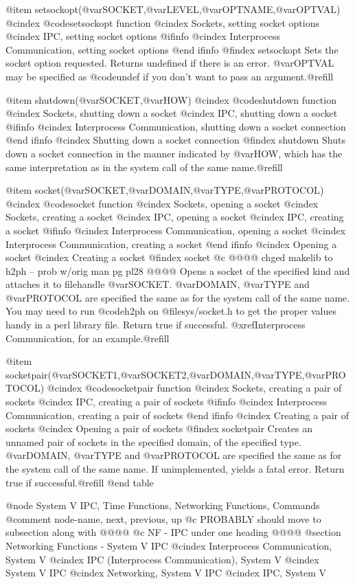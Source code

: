 {{{{{{{@item setsockopt(@var{SOCKET},@var{LEVEL},@var{OPTNAME},@var{OPTVAL})
@cindex @code{setsockopt} function
@cindex Sockets, setting socket options
@cindex IPC, setting socket options
@ifinfo
@cindex Interprocess Communication, setting socket options
@end ifinfo
@findex setsockopt
Sets the socket option requested.  Returns undefined if there is an
error.  @var{OPTVAL} may be specified as @code{undef} if you don't want
to pass an argument.@refill

@item shutdown(@var{SOCKET},@var{HOW})
@cindex @code{shutdown} function
@cindex Sockets, shutting down a socket
@cindex IPC, shutting down a socket
@ifinfo
@cindex Interprocess Communication, shutting down a socket connection
@end ifinfo
@cindex Shutting down a socket connection
@findex shutdown
Shuts down a socket connection in the manner indicated by @var{HOW},
which has the same interpretation as in the system call of the same
name.@refill

@item socket(@var{SOCKET},@var{DOMAIN},@var{TYPE},@var{PROTOCOL})
@cindex @code{socket} function
@cindex Sockets, opening a socket
@cindex Sockets, creating a socket
@cindex IPC, opening a socket
@cindex IPC, creating a socket
@ifinfo
@cindex Interprocess Communication, opening a socket
@cindex Interprocess Communication, creating a socket
@end ifinfo
@cindex Opening a socket
@cindex Creating a socket
@findex socket
@c @@@@ chged makelib to h2ph -- prob w/orig man pg pl28 @@@@
Opens a socket of the specified kind and attaches it to filehandle
@var{SOCKET}.  @var{DOMAIN}, @var{TYPE} and @var{PROTOCOL} are specified
the same as for the system call of the same name.  You may need to run
@code{h2ph} on @file{sys/socket.h} to get the proper values handy in
a perl library file.  Return true if successful.  @xref{Interprocess
Communication}, for an example.@refill

@item socketpair(@var{SOCKET1},@var{SOCKET2},@var{DOMAIN},@var{TYPE},@var{PROTOCOL})
@cindex @code{socketpair} function
@cindex Sockets, creating a pair of sockets
@cindex IPC, creating a pair of sockets
@ifinfo
@cindex Interprocess Communication, creating a pair of sockets
@end ifinfo
@cindex Creating a pair of sockets
@cindex Opening a pair of sockets
@findex socketpair
Creates an unnamed pair of sockets in the specified domain, of the
specified type.  @var{DOMAIN}, @var{TYPE} and @var{PROTOCOL} are
specified the same as for the system call of the same name.  If
unimplemented, yields a fatal error.  Return true if successful.@refill
@end table

@node     System V IPC, Time Functions, Networking Functions, Commands
@comment  node-name,  next,  previous,  up
@c PROBABLY should move to subsection along with @@@@
@c NF - IPC under one heading @@@@
@section Networking Functions - System V IPC
@cindex Interprocess Communication, System V
@cindex IPC (Interprocess Communication), System V
@cindex System V IPC
@cindex Networking, System V IPC
@cindex IPC, System V

}}}}}}}
